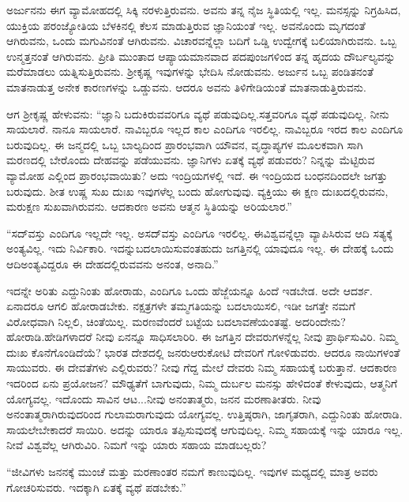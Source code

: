 ಅರ್ಜುನನು ಈಗ ವ್ಯಾಮೋಹದಲ್ಲಿ ಸಿಕ್ಕಿ ನರಳುತ್ತಿರುವನು. ಅವನು ತನ್ನ ನೈಜ ಸ್ಥಿತಿಯಲ್ಲಿ ಇಲ್ಲ. ಮನಸ್ಸನ್ನು ನಿಗ್ರಹಿಸಿದ, ಯುಕ್ತಿಯ ಪರಂಜ್ಯೋತಿಯ ಬೆಳಕಿನಲ್ಲಿ ಕೆಲಸ ಮಾಡುತ್ತಿರುವ ಜ್ಞಾನಿಯಂತೆ ಇಲ್ಲ. ಅವನೊಂದು ಮೃಗದಂತೆ ಆಗಿರುವನು, ಒಂದು ಮಗುವಿನಂತೆ ಆಗಿರುವನು. ವಿಚಾರವನ್ನೆಲ್ಲಾ ಬದಿಗೆ ಒಡ್ಡಿ ಉದ್ವೇಗಕ್ಕೆ ಬಲಿಯಾಗಿರುವನು. ಒಬ್ಬ ಉನ್ಮತ್ತನಂತೆ ಆಗಿರುವನು. ಪ್ರೀತಿ ಮುಂತಾದ ಆಪ್ಯಾಯಮಾನವಾದ ಪದಪುಂಜಗಳಿಂದ ತನ್ನ ಹೃದಯ ದೌರ್ಬಲ್ಯವನ್ನು ಮರೆಮಾಡಲು ಯತ್ನಿಸುತ್ತಿರುವನು. ಶ‍್ರೀಕೃಷ್ಣ ಇವುಗಳನ್ನು ಭೇದಿಸಿ ನೋಡುವನು. ಅರ್ಜುನ ಒಬ್ಬ ಪಂಡಿತನಂತೆ ಮಾತನಾಡುತ್ತ ಅನೇಕ ಕಾರಣಗಳನ್ನು ಒಡ್ಡುವನು. ಆದರೂ ಅವನು ತಿಳಿಗೇಡಿಯಂತೆ ಮಾತನಾಡುತ್ತಿರುವನು.

ಆಗ ಶ‍್ರೀಕೃಷ್ಣ ಹೇಳುವನು: “ಜ್ಞಾನಿ ಬದುಕಿರುವವರಿಗೂ ವ್ಯಥೆ ಪಡುವುದಿಲ್ಲ.\break ಸತ್ತವರಿಗೂ ವ್ಯಥೆ ಪಡುವುದಿಲ್ಲ.  ನೀನು ಸಾಯಲಾರೆ. ನಾನೂ ಸಾಯಲಾರೆ. ನಾವಿಬ್ಬರೂ ಇಲ್ಲದ ಕಾಲ ಎಂದಿಗೂ ಇರಲಿಲ್ಲ. ನಾವಿಬ್ಬರೂ ಇರದ ಕಾಲ ಎಂದಿಗೂ ಬರುವುದಿಲ್ಲ. ಈ ಜನ್ಮದಲ್ಲಿ ಒಬ್ಬ ಬಾಲ್ಯದಿಂದ ಪ್ರಾರಂಭವಾಗಿ ಯೌವನ, ವೃದ್ಧಾಪ್ಯಗಳ ಮೂಲಕವಾಗಿ ಸಾಗಿ ಮರಣದಲ್ಲಿ ಬೇರೊಂದು ದೇಹವನ್ನು ಪಡೆಯುವನು. ಜ್ಞಾನಿಗಳು ಏತಕ್ಕೆ ವ್ಯಥೆ ಪಡುವರು?  ನಿನ್ನನ್ನು ಮೆಟ್ಟಿರುವ ವ್ಯಾಮೋಹ ಎಲ್ಲಿಂದ ಪ್ರಾರಂಭವಾಯಿತು? ಅದು ಇಂದ್ರಿಯಗಳಲ್ಲಿ ಇದೆ. ಈ ಇಂದ್ರಿಯದ ಬಂಧನದಿಂದಲೇ ಜಗತ್ತು ಬರುವುದು. ಶೀತ ಉಷ್ಣ ಸುಖ ದುಃಖ ಇವುಗಳೆಲ್ಲ ಬಂದು ಹೋಗುವುವು.  ವ್ಯಕ್ತಿಯು ಈ ಕ್ಷಣ ದುಃಖದಲ್ಲಿರುವನು, ಮರುಕ್ಷಣ ಸುಖವಾಗಿರುವನು. ಆದಕಾರಣ ಅವನು ಆತ್ಮನ ಸ್ಥಿತಿಯನ್ನು ಅರಿಯಲಾರ.”

“ಸದ್​ವಸ್ತು ಎಂದಿಗೂ ಇಲ್ಲದೇ ಇಲ್ಲ. ಅಸದ್​ವಸ್ತು ಎಂದಿಗೂ ಇರಲಿಲ್ಲ. ಈ\break ವಿಶ್ವವನ್ನೆಲ್ಲಾ ವ್ಯಾಪಿಸಿರುವ ಆದಿ ಸತ್ಯಕ್ಕೆ ಅಂತ್ಯವಿಲ್ಲ. ಇದು ನಿರ್ವಿಕಾರಿ. ಇದನ್ನು\break ಬದಲಾಯಿಸುವಂತಹುದು ಜಗತ್ತಿನಲ್ಲಿ ಯಾವುದೂ ಇಲ್ಲ. ಈ ದೇಹಕ್ಕೆ ಒಂದು ಆದಿ\break ಅಂತ್ಯವಿದ್ದರೂ ಈ ದೇಹದಲ್ಲಿರುವವನು ಅನಂತ, ಅನಾದಿ.” 

ಇದನ್ನೇ ಅರಿತು ಎದ್ದುನಿಂತು ಹೋರಾಡು, ಎಂದಿಗೂ ಒಂದು ಹೆಜ್ಜೆಯನ್ನೂ ಹಿಂದೆ ಇಡಬೇಡ. ಅದೇ ಆದರ್ಶ. ಏನಾದರೂ ಆಗಲಿ ಹೋರಾಡಬೇಕು. ನಕ್ಷತ್ರಗಳೇ ತಮ್ಮ\break ಗತಿಯನ್ನು ಬದಲಾಯಿಸಲಿ, ಇಡೀ ಜಗತ್ತೇ ನಮಗೆ ವಿರೋಧವಾಗಿ ನಿಲ್ಲಲಿ, ಚಿಂತೆಯಿಲ್ಲ. ಮರಣವೆಂದರೆ ಬಟ್ಟೆಯ ಬದಲಾವಣೆಯಂತಷ್ಟೆ. ಅದರಿಂದೇನು? ಹೋರಾಡಿ.\break ಹೇಡಿಗಳಾದರೆ ನೀವು ಏನನ್ನೂ ಸಾಧಿಸಲಾರಿರಿ. ಈ ಜಗತ್ತಿನ ದೇವರುಗಳನ್ನೆಲ್ಲ ನೀವು ಪ್ರಾರ್ಥಿಸುವಿರಿ. ನಿಮ್ಮ ದುಃಖ ಕೊನೆಗೊಂಡಿದೆಯೆ? ಭಾರತ ದೇಶದಲ್ಲಿ ಜನರು\break ಆರುಕೋಟಿ ದೇವರಿಗೆ ಗೋಳಿಡುವರು. ಆದರೂ ನಾಯಿಗಳಂತೆ ಸಾಯುವರು. ಈ ದೇವತೆಗಳು ಎಲ್ಲಿರುವರು? ನೀವು ಗೆದ್ದ ಮೇಲೆ ದೇವರು ನಿಮ್ಮ ಸಹಾಯಕ್ಕೆ ಬರುತ್ತಾನೆ. ಆದಕಾರಣ ಇದರಿಂದ ಏನು ಪ್ರಯೋಜನ? ಮೌಢ್ಯತೆಗೆ ಬಾಗುವುದು, ನಿಮ್ಮ ದುರ್ಬಲ ಮನಸ್ಸು ಹೇಳಿದಂತೆ ಕೇಳುವುದು, ಆತ್ಮನಿಗೆ ಯೋಗ್ಯವಲ್ಲ. ಇದೊಂದು ಸಾವಿನ ಆಟ...ನೀವು ಅನಂತಾತ್ಮರು, ಜನನ ಮರಣಾತೀತರು. ನೀವು ಅನಂತಾತ್ಮರಾಗಿರುವುದರಿಂದ ಗುಲಾಮರಾಗುವುದು ಯೋಗ್ಯವಲ್ಲ. ಉತ್ತಿಷ್ಠರಾಗಿ, ಜಾಗೃತರಾಗಿ, ಎದ್ದುನಿಂತು ಹೋರಾಡಿ. ಸಾಯಲೇಬೇಕಾದರೆ ಸಾಯಿರಿ. ಅದನ್ನು ಯಾರೂ ತಪ್ಪಿಸುವುದಕ್ಕೆ ಆಗುವುದಿಲ್ಲ. ನಿಮ್ಮ ಸಹಾಯಕ್ಕೆ ಇನ್ನು ಯಾರೂ ಇಲ್ಲ. ನೀವೆ ವಿಶ್ವವೆಲ್ಲ ಆಗಿರುವಿರಿ. ನಿಮಗೆ ಇನ್ನು ಯಾರು ಸಹಾಯ ಮಾಡಬಲ್ಲರು?

“ಜೀವಿಗಳು ಜನನಕ್ಕೆ ಮುಂಚೆ ಮತ್ತು ಮರಣಾಂತರ ನಮಗೆ ಕಾಣುವುದಿಲ್ಲ. ಇವುಗಳ ಮಧ್ಯದಲ್ಲಿ ಮಾತ್ರ ಅವರು ಗೋಚರಿಸುವರು. ಇದಕ್ಕಾಗಿ ಏತಕ್ಕೆ ವ್ಯಥೆ ಪಡಬೇಕು.” 

